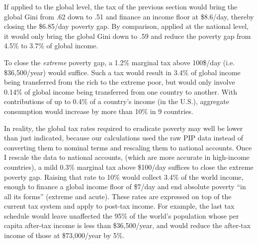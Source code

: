 If applied to the global level, the tax of the previous section would bring the global Gini from .62 down to .51 and finance an income floor at \$8.6/day, thereby closing the \$6.85/day poverty gap. By comparison, applied at the national level, it would only bring the global Gini down to .59 and reduce the poverty gap from 4.5\% to 3.7\% of global income. 

To close the \textit{extreme} poverty gap, a 1.2\% marginal tax %
above 100\$/day (i.e. \$36,500/year) would suffice. %
Such a tax would result in 3.4\% of global income being transferred from the rich to the extreme poor, but would only involve 0.14\% of global income being transferred from one country to another. 
With contributions of up to 0.4\% of a country's income (in the U.S.), aggregate consumption would increase by more than 10\% in 9 countries. 

In reality, the global tax rates required to eradicate poverty may well be lower than just indicated, because our calculations used the raw PIP data instead of converting them to nominal terms and rescaling them to national accounts. Once I rescale the data to national accounts, (which are more accurate in high-income countries), 
a mild 0.3\% marginal tax above \$100/day suffices to close the extreme poverty gap. Raising that rate to 10\% would collect 3.4\% of the world income, enough to finance a global income floor of \$7/day and end absolute poverty ``in all its forms'' (extreme and acute). %
These rates are expressed on top of the current tax system and apply to post-tax income. For example, the last tax schedule would leave unaffected the 95\% of the world's population whose per capita after-tax income is less than \$36,500/year, and would reduce the after-tax income of those at \$73,000/year by 5\%. 

